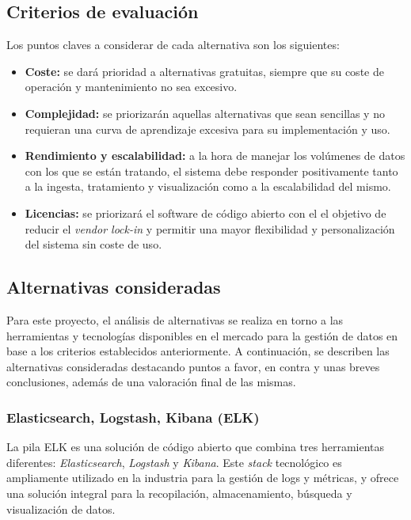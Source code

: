 

\subsection{Criterios de evaluación}
Los puntos claves a considerar de cada alternativa son los siguientes:

\begin{itemize}
	\item \textbf{Coste:} se dará prioridad a alternativas gratuitas, siempre
		que su coste de operación y mantenimiento no sea excesivo.
	\item \textbf{Complejidad:} se priorizarán aquellas alternativas que
		sean sencillas y no requieran una curva de aprendizaje excesiva para
		su implementación y uso.
	\item \textbf{Rendimiento y escalabilidad:} a la hora de manejar los
		volúmenes de datos con los que se están tratando, el sistema debe
		responder positivamente tanto a la ingesta, tratamiento y visualización
		como a la escalabilidad del mismo.
	\item \textbf{Licencias:} se priorizará el software de código abierto con el
		el objetivo de reducir el \textit{vendor lock-in} y permitir una mayor
		flexibilidad y personalización del sistema sin coste de uso.
\end{itemize}


\newpage{}
\subsection{Alternativas consideradas}
Para este proyecto, el análisis de alternativas se realiza en torno a las
herramientas y tecnologías disponibles en el mercado para la gestión de datos en
base a los criterios establecidos anteriormente. A continuación, se describen
las alternativas consideradas destacando puntos a favor, en contra y unas
breves conclusiones, además de una valoración final de las mismas.


\subsubsection{Elasticsearch, Logstash, Kibana (ELK)}
La pila ELK es una solución de código abierto que combina tres herramientas
diferentes: \textit{Elasticsearch}, \textit{Logstash} y \textit{Kibana}. Este
\textit{stack} tecnológico es ampliamente utilizado en la industria para la
gestión de logs y métricas, y ofrece una solución integral para la recopilación,
almacenamiento, búsqueda y visualización de datos.

